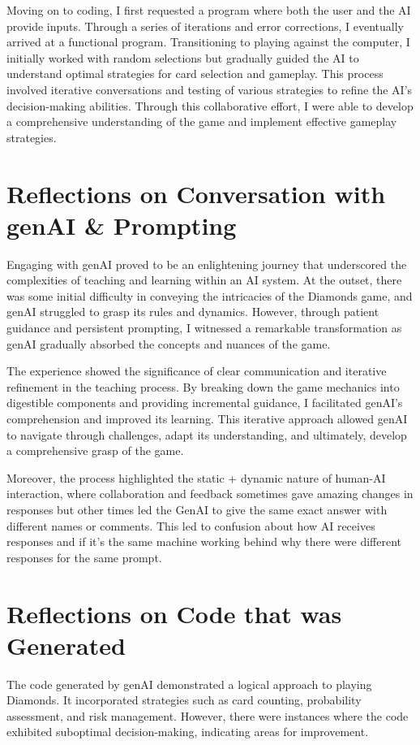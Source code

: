 \documentclass{article}
\begin{document}
Moving on to coding, I first requested a program where both the user and the AI provide inputs. Through a series of iterations and error corrections, I eventually arrived at a functional program. Transitioning to playing against the computer, I initially worked with random selections but gradually guided the AI to understand optimal strategies for card selection and gameplay. This process involved iterative conversations and testing of various strategies to refine the AI's decision-making abilities. Through this collaborative effort, I were able to develop a comprehensive understanding of the game and implement effective gameplay strategies.



\vspace{50pt}

\section{Reflections on Conversation with genAI \& Prompting}
Engaging with genAI proved to be an enlightening journey that underscored the complexities of teaching and learning within an AI system. At the outset, there was some initial difficulty in conveying the intricacies of the Diamonds game, and genAI struggled to grasp its rules and dynamics. However, through patient guidance and persistent prompting, I witnessed a remarkable transformation as genAI gradually absorbed the concepts and nuances of the game.

The experience showed the significance of clear communication and iterative refinement in the teaching process. By breaking down the game mechanics into digestible components and providing incremental guidance, I facilitated genAI's comprehension and improved its learning. This iterative approach allowed genAI to navigate through challenges, adapt its understanding, and ultimately, develop a comprehensive grasp of the game.

Moreover, the process highlighted the static + dynamic nature of human-AI interaction, where collaboration and feedback sometimes gave amazing changes in responses but other times led the GenAI to give the same exact answer with different names or comments. This led to confusion about how AI receives responses and if it's the same machine working behind why there were different responses for the same prompt.
\section{Reflections on Code that was Generated}
The code generated by genAI demonstrated a logical approach to playing Diamonds. It incorporated strategies such as card counting, probability assessment, and risk management. However, there were instances where the code exhibited suboptimal decision-making, indicating areas for improvement.
\end{document}
